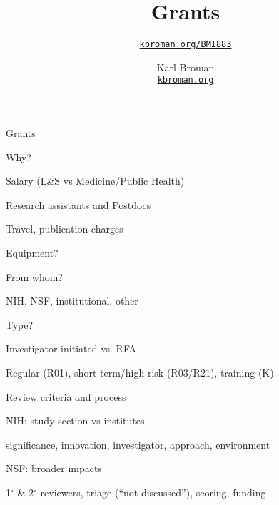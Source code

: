 \documentclass[aspectratio=169,12pt,t]{beamer}
\title{Grants}
\subtitle{}
\author{\href{https://kbroman.org/BMI883}{\tt kbroman.org/BMI883} }
\institute{}
\date{\small \hspace{3in} Karl Broman \\
  \hspace{3in} \href{https://kbroman.org}{\color{foreground}
    \small \tt kbroman.org}}
\begin{document}
\begin{frame}{Grants}

\bi
\item Why?
    \bi
    \item Salary (L\&S vs Medicine/Public Health)
    \item Research assistants and Postdocs
    \item Travel, publication charges
    \item Equipment?
    \ei
\item From whom?
    \bi
    \item NIH, NSF, institutional, other
    \ei
\item Type?
    \bi
    \item Investigator-initiated vs. RFA
    \item Regular (R01), short-term/high-risk (R03/R21), training (K)
    \ei
\item Review criteria and process
    \bi
    \item NIH: study section vs institutes
    \item {\footnotesize significance, innovation, investigator, approach, environment}
    \item NSF: broader impacts
    \item 1$^{\circ}$ \& 2$^{\circ}$ reviewers, triage (``not discussed''), scoring, funding
    \ei
\ei

\end{frame}
\end{document}
